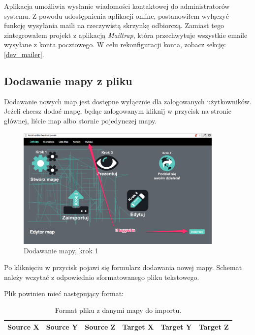 Aplikacja umożliwia wysłanie wiadomości kontaktowej do administratorów systemu. Z powodu udostępnienia aplikacji online, postanowiłem wyłączyć funkcję wysyłania maili na rzeczywistą skrzynkę odbiorczą. Zamiast tego zintegrowałem projekt z aplikacją \textit{Mailtrap}, która przechwytuje wszystkie emaile wysyłane z konta pocztowego. W celu rekonfiguracji konta, zobacz sekcję: \ref{dev_mailer}.

\subsection{Dodawanie mapy z pliku}

Dodawanie nowych map jest dostępne wyłącznie dla zalogowanych użytkowników. Jeżeli chcesz dodać mapę, będąc zalogowanym kliknij w przycisk na stronie głównej, liście map albo stornie pojedynczej mapy.

\FloatBarrier
 	\begin{figure}[ht]
        \centering
        \includegraphics[width=0.90\textwidth,height=0.46\textheight]{img/add_map1.png}
	\caption{Dodawanie mapy, krok 1}
        \label{rys:screen_add_map1}
    \end{figure}
\FloatBarrier

Po kliknięciu w przycisk pojawi się formularz dodawania nowej mapy. Schemat należy wczytać z odpowiednio sformatowanego pliku tekstowego.

Plik powinien mieć następujący format:

\begin{table}[h]
	\centering
	\begin{tabular}{|l|l|l|l|l|l|}
		Source X & Source Y & Source Z & Target X & Target Y & Target Z \\ \hline
	\end{tabular}
	\caption{Format pliku z danymi mapy do importu.}
	\label{tab:file_format}
\end{table}

